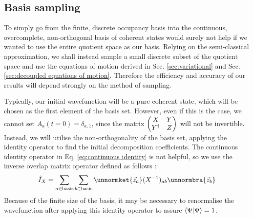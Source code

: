 \documentclass[12pt]{article}
\begin{document}
	\subsection{Basis sampling}
	
	To simply go from the finite, discrete occupancy basis into the continuous, overcomplete, non-orthogonal basis of coherent states would surely not help if we wanted to use the entire quotient space as our basis. Relying on the semi-classical approximation, we shall instead sample a small discrete subset of the quotient space and use the equations of motion derived in Sec. \ref{sec:variational} and Sec. \ref{sec:decoupled equations of motion}. Therefore the efficiency and accuracy of our results will depend strongly on the method of sampling.
	
	Typically, our initial wavefunction will be a pure coherent state, which will be chosen as the first element of the basis set. However, even if this is the case, we cannot set $A_a(t=0)=\delta_{a,1}$, since the matrix $\mqty(X & Y\\Y^\dagger & Z)$ will not be invertible. Instead, we will utilise the non-orthogonality of the basis set, applying the identity operator to find the initial decomposition coefficients. The continuous identity operator in Eq. \ref{eq:continuous identity} is not helpful, so we use the inverse overlap matrix operator defined as follows \cite[Eq. 13]{Aguiar}:
	\begin{equation}
	\hat{I}_{X}=\sum_{a\in\text{basis}}\sum_{b\in\text{basis}}\unnormket{\vec{z}_a}(X^{-1})_{ab}\unnormbra{\vec{z}_b}
	\end{equation}
	Because of the finite size of the basis, it may be necessary to renormalise the wavefunction after applying this identity operator to assure $\braket{\Psi}{\Psi}=1$.
	
\end{document}
